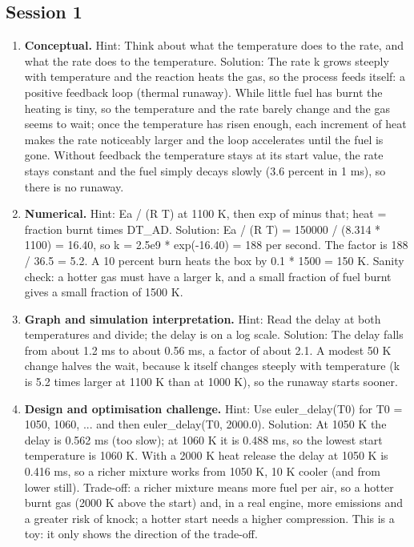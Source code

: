 \documentclass[11pt,a4paper]{article}
\begin{document}
\subsection*{Session 1}
\begin{enumerate}[nosep]
\item \textbf{Conceptual.} Hint: Think about what the temperature does to the rate, and what the rate does to the temperature. Solution: The rate k grows steeply with temperature and the reaction heats the gas, so the process feeds itself: a positive feedback loop (thermal runaway). While little fuel has burnt the heating is tiny, so the temperature and the rate barely change and the gas seems to wait; once the temperature has risen enough, each increment of heat makes the rate noticeably larger and the loop accelerates until the fuel is gone. Without feedback the temperature stays at its start value, the rate stays constant and the fuel simply decays slowly (3.6 percent in 1 ms), so there is no runaway.
\item \textbf{Numerical.} Hint: Ea / (R T) at 1100 K, then exp of minus that; heat = fraction burnt times DT\_AD. Solution: Ea / (R T) = 150000 / (8.314 * 1100) = 16.40, so k = 2.5e9 * exp(-16.40) = 188 per second. The factor is 188 / 36.5 = 5.2. A 10 percent burn heats the box by 0.1 * 1500 = 150 K. Sanity check: a hotter gas must have a larger k, and a small fraction of fuel burnt gives a small fraction of 1500 K.
\item \textbf{Graph and simulation interpretation.} Hint: Read the delay at both temperatures and divide; the delay is on a log scale. Solution: The delay falls from about 1.2 ms to about 0.56 ms, a factor of about 2.1. A modest 50 K change halves the wait, because k itself changes steeply with temperature (k is 5.2 times larger at 1100 K than at 1000 K), so the runaway starts sooner.
\item \textbf{Design and optimisation challenge.} Hint: Use euler\_delay(T0) for T0 = 1050, 1060, ... and then euler\_delay(T0, 2000.0). Solution: At 1050 K the delay is 0.562 ms (too slow); at 1060 K it is 0.488 ms, so the lowest start temperature is 1060 K. With a 2000 K heat release the delay at 1050 K is 0.416 ms, so a richer mixture works from 1050 K, 10 K cooler (and from lower still). Trade-off: a richer mixture means more fuel per air, so a hotter burnt gas (2000 K above the start) and, in a real engine, more emissions and a greater risk of knock; a hotter start needs a higher compression. This is a toy: it only shows the direction of the trade-off.
\end{enumerate}
\end{document}
